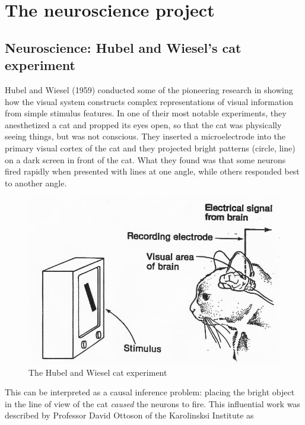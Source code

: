 \section{The neuroscience project}
 
 
\subsection*{Neuroscience: Hubel and Wiesel's cat experiment}

Hubel and Wiesel (1959) conducted some of the pioneering research in showing how the visual system constructs complex representations of visual information from simple stimulus features. In one of their most notable experiments, they anesthetized a cat and propped its eyes open, so that the cat was physically seeing things, but was not conscious. They inserted a microelectrode into the primary visual cortex of the cat and they projected bright patterns (circle, line) on a dark screen in front of the cat. What they found was that some neurons fired rapidly when presented with lines at one angle, while others responded best to another angle. 



\begin{figure}[H]
\begin{center}
\includegraphics[scale=0.25]{hubel.jpg}
\end{center}
\caption{The Hubel and Wiesel cat experiment}
\label{fig:cat}
\end{figure}



This can be interpreted as a causal inference problem: placing the bright object in the line of view of the cat \emph{caused} the neurons to fire. This influential work was described by Professor David Ottoson of the Karolinsksi Institute as

